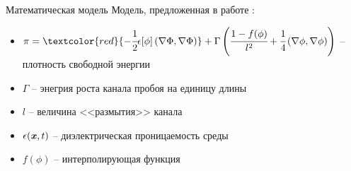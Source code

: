 \begin{frame}{Математическая модель}
Модель, предложенная в работе \cite{pitike_dielectric_breakdown}:
\begin{itemize}
	\item $\pi = \textcolor{red}{-\half \epsilon[\phi] \gradscalsq{\Phi}} + \Gamma \left( \cfrac{1 - f(\phi)}{l^2} + \cfrac{1}{4} \gradscalsq{\phi} \right)$ -- плотность свободной энергии
	\item $\Gamma$ -- энегрия роста канала пробоя на единицу длины
	\item $l$ -- величина <<размытия>> канала
	\item $\epsilon({\textbf{\textit{x}}}, t)$ -- диэлектрическая проницаемость среды
	\item $f(\phi)$ -- интерполирующая функция
\end{itemize}
\end{frame}


